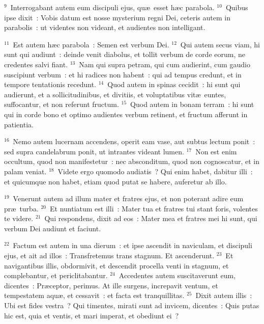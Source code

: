 ${}^{9}$~Interrogabant autem eum discipuli ejus, qu\ae\ esset h\ae c parabola.
${}^{10}$~Quibus ipse dixit~: Vobis datum est nosse mysterium regni Dei, ceteris autem in parabolis~: ut videntes non videant, et audientes non intelligant.


${}^{11}$~Est autem h\ae c parabola~: Semen est verbum Dei.
${}^{12}$~Qui autem secus viam, hi sunt qui audiunt~: deinde venit diabolus, et tollit verbum de corde eorum, ne credentes salvi fiant.
${}^{13}$~Nam qui supra petram, qui cum audierint, cum gaudio suscipiunt verbum~: et hi radices non habent~: qui ad tempus credunt, et in tempore tentationis recedunt.
${}^{14}$~Quod autem in spinas cecidit~: hi sunt qui audierunt, et a sollicitudinibus, et divitiis, et voluptatibus vit\ae\ euntes, suffocantur, et non referunt fructum.
${}^{15}$~Quod autem in bonam terram~: hi sunt qui in corde bono et optimo audientes verbum retinent, et fructum afferunt in patientia.


${}^{16}$~Nemo autem lucernam accendens, operit eam vase, aut subtus lectum ponit~: sed supra candelabrum ponit, ut intrantes videant lumen.
${}^{17}$~Non est enim occultum, quod non manifestetur~: nec absconditum, quod non cognoscatur, et in palam veniat.
${}^{18}$~Videte ergo quomodo audiatis~? Qui enim habet, dabitur illi~: et quicumque non habet, etiam quod putat se habere, auferetur ab illo.


${}^{19}$~Venerunt autem ad illum mater et fratres ejus, et non poterant adire eum pr\ae\ turba.
${}^{20}$~Et nuntiatum est illi~: Mater tua et fratres tui stant foris, volentes te videre.
${}^{21}$~Qui respondens, dixit ad eos~: Mater mea et fratres mei hi sunt, qui verbum Dei audiunt et faciunt.


${}^{22}$~Factum est autem in una dierum~: et ipse ascendit in naviculam, et discipuli ejus, et ait ad illos~: Transfretemus trans stagnum. Et ascenderunt.
${}^{23}$~Et navigantibus illis, obdormivit, et descendit procella venti in stagnum, et complebantur, et periclitabantur.
${}^{24}$~Accedentes autem suscitaverunt eum, dicentes~: Pr\ae ceptor, perimus. At ille surgens, increpavit ventum, et tempestatem aqu\ae , et cessavit~: et facta est tranquillitas.
${}^{25}$~Dixit autem illis~: Ubi est fides vestra~? Qui timentes, mirati sunt ad invicem, dicentes~: Quis putas hic est, quia et ventis, et mari imperat, et obediunt ei~?



